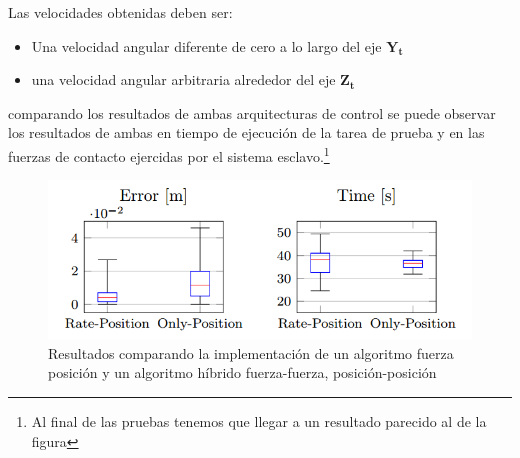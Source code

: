 Las velocidades obtenidas deben ser:

\begin{itemize}
\item Una velocidad angular diferente de cero a lo largo del eje $\mathbf{Y_t}$

\item una velocidad angular arbitraria alrededor del eje $\mathbf{Z_t}$

\end{itemize}



comparando los resultados de ambas arquitecturas de control se puede observar los resultados de ambas en tiempo de ejecución de la tarea de prueba y en las fuerzas de contacto ejercidas por el sistema esclavo.\footnote{Al final de las pruebas tenemos que llegar a un resultado parecido al de la figura }



\begin{figure}[htb!]
\centering
\includegraphics[scale=0.80]{Figures/comparativaAlgoritmos}
\caption{Resultados comparando la implementación de un algoritmo fuerza posición y un algoritmo híbrido fuerza-fuerza, posición-posición}
\label{fig:resultados}
\end{figure}



